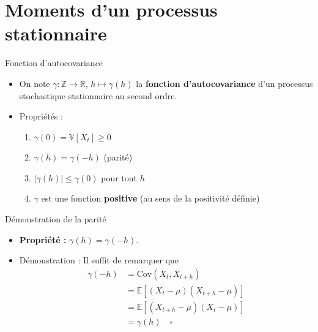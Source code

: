 \documentclass[11pt,aspectratio=169]{beamer}
\newcommand{\E}{\mathbb{E}}
\newcommand{\Var}{\mathbb{V}}
\newcommand{\Cov}{\mathrm{Cov}}
\newcommand{\R}{\mathbb{R}}
\newcommand{\Z}{\mathbb{Z}}
\begin{document}
\section{Moments d'un processus stationnaire}

\begin{frame}{Fonction d'autocovariance}

\begin{itemize}

\item On note $\gamma : \Z \to \R$, $h \mapsto \gamma(h)$ la \textbf{fonction d'autocovariance} d'un processus stochastique stationnaire au second ordre.\newline

\item Propriétés :
  \begin{enumerate}
    \item $\gamma(0) = \Var[X_t] \geq 0$\newline
    \item $\gamma(h) = \gamma(-h)$ \quad (parité)\newline
    \item $|\gamma(h)| \leq \gamma(0)$ \quad pour tout $h$\newline
    \item $\gamma$ est une fonction \textbf{positive} (au sens de la positivité définie)
  \end{enumerate}

\end{itemize}

\end{frame}

\begin{frame}{Démonstration de la parité}

\begin{itemize}

\item \textbf{Propriété :} $\gamma(h) = \gamma(-h)$.\newline

\item Démonstration : Il suffit de remarquer que
  \begin{align*}
  \gamma(-h) &= \Cov(X_t, X_{t+h}) \\
  &= \E\left[(X_t - \mu)(X_{t+h} - \mu)\right] \\
  &= \E\left[(X_{t+h} - \mu)(X_t - \mu)\right] \\
  &= \gamma(h) \quad \square
  \end{align*}

\end{itemize}

\end{frame}
\end{document}
